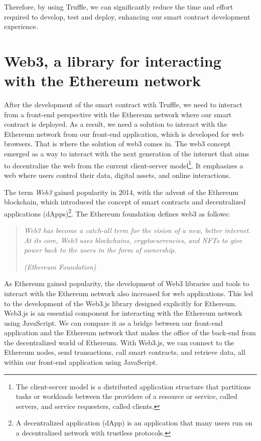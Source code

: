 Therefore, by using Truffle, we can significantly reduce the time and effort required to develop, test and deploy, enhancing our smart contract development experience.




\section{Web3, a library for interacting with the Ethereum network}
\label{sec:ch2_web3}

After the development of the smart contract with Truffle, we need to interact from a front-end perspective with the Ethereum network where our
smart contract is deployed. As a result, we need a solution to interact with the Ethereum network from our front-end application, which is
developed for web browsers. That is where the solution of web3 \cite{eth_web3} comes in. The web3 concept emerged as a way to interact with
the next generation of the internet that aims to decentralize the web from the current client-server model\footnote{The client-server model is a
   distributed application structure that partitions tasks or workloads between the providers of a resource or service, called servers, and service
   requesters, called clients.}. It emphasizes a web where users control their data, digital assets, and online interactions.


The term \textit{Web3} gained popularity in 2014, with the advent of the Ethereum blockchain, which introduced the concept of smart contracts
and decentralized applications (dApps)\footnote{A decentralized application (dApp) is an application that many users run on a decentralized
   network with trustless protocols.}. The Ethereum foundation \cite{eth_web3} defines web3 as follows:


\begin{quote}
   \textit{Web3 has become a catch-all term for the vision of a new, better internet. At its core, Web3 uses blockchains, cryptocurrencies, and NFTs to give power back to the users in the form of ownership.}


   \textit{(Ethereum Foundation)}
\end{quote}


As Ethereum gained popularity, the development of Web3 libraries and tools to interact with the Ethereum network also increased for web applications.
This led to the development of the Web3.js library \cite{eth_web3js} designed explicitly for Ethereum. Web3.js is an essential component for interacting
with the Ethereum network using JavaScript. We can compare it as a bridge between our front-end application and the Ethereum network that makes the office of
the back-end from the decentralized world of Ethereum. With Web3.js, we can connect to the Ethereum nodes, send transactions, call smart contracts, and retrieve
data, all within our front-end application using JavaScript.


